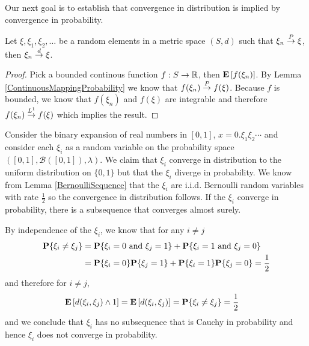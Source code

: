 Our next goal is to establish that convergence in
distribution is implied by convergence in probability.
\begin{lem}\label{ConvergenceInProbabilityImpliesConvergenceInDistribution}Let $\xi, \xi_1, \xi_2, \dots$ be a random elements in a
  metric space $(S,d)$ such that $\xi_n \overset{P}\to \xi$, then $\xi_n
  \overset{d}\to \xi$.
\end{lem}
\begin{proof}Pick a bounded continous function $f : S \to \mathbb{R}$,
  then $\textbf{E}\left[f(\xi_n)\right]$.  By Lemma
  \ref{ContinuousMappingProbability} we know that $f(\xi_n) \overset{P}\to
  f(\xi)$.  Because $f$ is bounded, we know that $f(\xi_n)$ and
  $f(\xi)$ are integrable and therefore $f(\xi_n) \overset{L^1}\to f(\xi)$
  which implies the result.
\end{proof}

\begin{examp}Consider the binary expansion of real numbers in
  $[0,1]$, $x=0.\xi_1\xi_2\cdots$ and consider each $\xi_i$ as a
  random variable on the probability space $([0,1],\mathcal{B}([0,1]),
  \lambda)$.  We claim that $\xi_i$ converge in distribution to the
  uniform distribution on $\lbrace 0,1 \rbrace$ but that the $\xi_i$ diverge
  in probability.  We know from Lemma \ref{BernoulliSequence} that the $\xi_i$ are
  i.i.d. Bernoulli random variables with rate $\frac{1}{2}$ so the
  convergence in distribution follows.  If the $\xi_i$ converge in
  probability, there is a subsequence that converges almost surely.

By independence of the $\xi_i$, we know that for any $i \neq j$ 
\begin{align*} 
\textbf{P}\{\xi_i \neq \xi_j\} &= \textbf{P}\{\xi_i=0 \text{ and }
  \xi_j=1\} + \textbf{P}\{\xi_i=1 \text{ and }
  \xi_j=0\} \\
&= \textbf{P}\{\xi_i=0\}
  \textbf{P}\{\xi_j=1\} + \textbf{P}\{\xi_i=1\}
  \textbf{P}\{\xi_j=0\}  = \frac{1}{2}
\end{align*}
and therefore for $i \neq j$, 
\begin{align*}
\textbf{E}\left[d(\xi_i, \xi_j) \wedge 1\right] &= \textbf{E}\left[d(\xi_i,
  \xi_j)\right] = \textbf{P}\{\xi_i \neq \xi_j\} = \frac{1}{2}
\end{align*}
and we conclude that $\xi_i$ has no subsequence that is Cauchy in
probability and hence $\xi_i$ does not converge in probability.
\end{examp}

